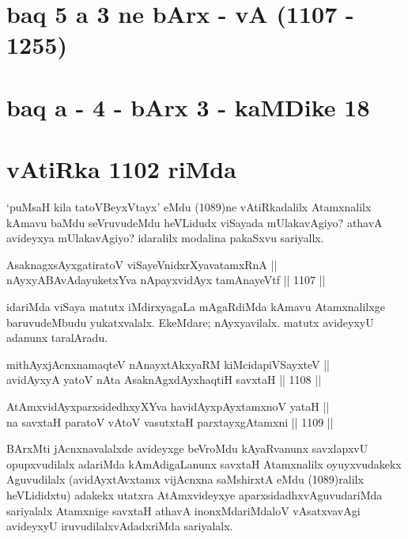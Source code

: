 \section*{baq 5 a 3 ne bArx - vA (1107 - 1255)}

\section*{baq a - 4 - bArx 3 - kaMDike 18}

\section*{vAtiRka 1102 riMda} 

\begin{artha}
`puMsaH kila tatoV\s BeyxVtayx' eMdu (1089)ne vAtiRkadalilx Atamxnalilx kAmavu baMdu seVruvudeMdu heVLidudx viSayada mUlakavAgiyo? athavA avideyxya mUlakavAgiyo? idaralilx modalina pakaSxvu sariyallx.
\end{artha}

\begin{shl}
AsaknagxsAyx\s \s gatiratoV viSayeVnidxrXyavatamxRnA || \\
nAyxyABAvAdayuketxYva nApayxvidAyx tamAnayeVtf ||  1107 ||  
\end{shl}

\begin{artha}
idariMda viSaya matutx iMdirxyagaLa mAgaRdiMda kAmavu Atamxnalilxge baruvudeMbudu yukatxvalalx. EkeMdare; nAyxyavilalx. matutx avideyxyU adanunx taralAradu.
\end{artha}


\begin{shl}
mithAyxjAcnxnamaqteV nAnayxtAkxyaRM kiMcidapiVSayxteV ||  \\
avidAyxyA yatoV nAta AsaknAgxdAyxhaqtiH savxtaH ||  1108 ||  
\end{shl}
				
\begin{shl}
AtAmxvidAyxparxsidedhxyXYva havidAyx\s pAyxtamxnoV yataH || \\
na savxtaH paratoV vA\s toV vasutxtaH parxtayxgAtamxni ||  1109 ||  
\end{shl}

\begin{artha}
BArxMti jAcnxnavalalxde avideyxge beVroMdu kAyaRvanunx savxlapxvU opupxvudilalx adariMda kAmAdigaLanunx savxtaH Atamxnalilx oyuyxvudakekx Aguvudilalx (avidAyxtAvxtamx vijAcnxna saMshirxtA eMdu (1089)ralilx heVLididxtu) adakekx utatxra AtAmxvideyxye aparxsidadhxvAguvudariMda sariyalalx Atamxnige savxtaH athavA inonxMdariMdaloV vAsatxvavAgi avideyxyU iruvudilalxvAdadxriMda sariyalalx.
\end{artha}

